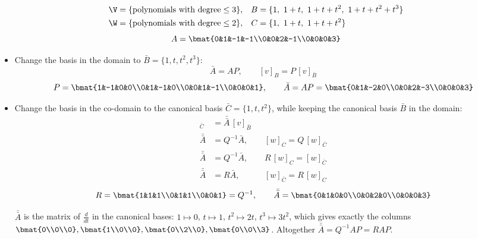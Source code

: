 \begin{example}
\begin{align*}
\V&=\{\text{polynomials with degree}\le 3\}, & B&=\{1,\ 1+t,\ 1+t+t^2,\ 1+t+t^2+t^3\}\\
\W&=\{\text{polynomials with degree}\le 2\}, & C&=\{1,\ 1+t,\ 1+t+t^2\}
\end{align*}
\[
A=\bmat{0&1&-1&-1\\0&0&2&-1\\0&0&0&3}
\]

\begin{itemize}[label=$*$]
\item\leavevmode{}Change the basis in the domain to $\bar B=\{1,t,t^2,t^3\}$:
\[
\bar A=AP, \qquad [v]_B=P\,[v]_{\bar B}
\]
\[
P=\bmat{1&-1&0&0\\0&1&-1&0\\0&0&1&-1\\0&0&0&1},
\qquad
\bar A=AP=\bmat{0&1&-2&0\\0&0&2&-3\\0&0&0&3}
\]
\item Change the basis in the co-domain to the canonical basis $\bar C=\{1,t,t^2\}$, while keeping the canonical basis $\bar B$ in the domain:
\begin{align*}
[w]_{\bar C}&=\bar{\bar A}\,[v]_{\bar B}\\
\bar{\bar A}&=Q^{-1}\bar A, && [w]_C=Q\,[w]_{\bar C}\\
\bar{\bar A}&=Q^{-1}\bar A, && R\,[w]_C=[w]_{\bar C}\\
\bar{\bar A}&=R\bar A, && [w]_{\bar C}=R\,[w]_C
\end{align*}
\[
R=\bmat{1&1&1\\0&1&1\\0&0&1}=Q^{-1},
\qquad
\bar{\bar A}=\bmat{0&1&0&0\\0&0&2&0\\0&0&0&3}
\]
\begin{insight}[Check]
$\bar{\bar A}$ is the matrix of $\frac{d}{dt}$ in the canonical bases: $1\mapsto0$, $t\mapsto1$, $t^2\mapsto2t$, $t^3\mapsto3t^2$, which gives exactly the columns $\bmat{0\\0\\0},\bmat{1\\0\\0},\bmat{0\\2\\0},\bmat{0\\0\\3}$. Altogether $\bar{\bar A}=Q^{-1}AP=RAP$.
\end{insight}
\end{itemize}
\end{example}

